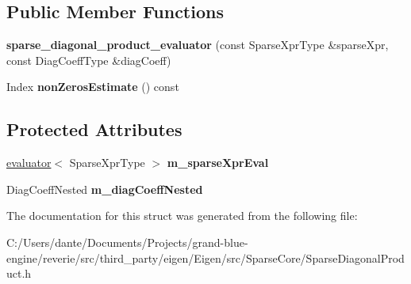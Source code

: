 \subsection*{Public Member Functions}
\begin{DoxyCompactItemize}
\item 
\mbox{\label{struct_eigen_1_1internal_1_1sparse__diagonal__product__evaluator_3_01_sparse_xpr_type_00_01_diag5c533b27b8fe485cf13e7ad699b99003_af38a1fdbcec00837065684a356004d77}} 
{\bfseries sparse\+\_\+diagonal\+\_\+product\+\_\+evaluator} (const Sparse\+Xpr\+Type \&sparse\+Xpr, const Diag\+Coeff\+Type \&diag\+Coeff)
\item 
\mbox{\label{struct_eigen_1_1internal_1_1sparse__diagonal__product__evaluator_3_01_sparse_xpr_type_00_01_diag5c533b27b8fe485cf13e7ad699b99003_a542f770b604b2d8c009169b23fe05265}} 
Index {\bfseries non\+Zeros\+Estimate} () const
\end{DoxyCompactItemize}
\subsection*{Protected Attributes}
\begin{DoxyCompactItemize}
\item 
\mbox{\label{struct_eigen_1_1internal_1_1sparse__diagonal__product__evaluator_3_01_sparse_xpr_type_00_01_diag5c533b27b8fe485cf13e7ad699b99003_a480dc7703547d27943d9c582e3bd3873}} 
\mbox{\hyperlink{struct_eigen_1_1internal_1_1evaluator}{evaluator}}$<$ Sparse\+Xpr\+Type $>$ {\bfseries m\+\_\+sparse\+Xpr\+Eval}
\item 
\mbox{\label{struct_eigen_1_1internal_1_1sparse__diagonal__product__evaluator_3_01_sparse_xpr_type_00_01_diag5c533b27b8fe485cf13e7ad699b99003_a7409f9ccdab3310c04bc195a04f5d8e0}} 
Diag\+Coeff\+Nested {\bfseries m\+\_\+diag\+Coeff\+Nested}
\end{DoxyCompactItemize}


The documentation for this struct was generated from the following file\+:\begin{DoxyCompactItemize}
\item 
C\+:/\+Users/dante/\+Documents/\+Projects/grand-\/blue-\/engine/reverie/src/third\+\_\+party/eigen/\+Eigen/src/\+Sparse\+Core/Sparse\+Diagonal\+Product.\+h\end{DoxyCompactItemize}
